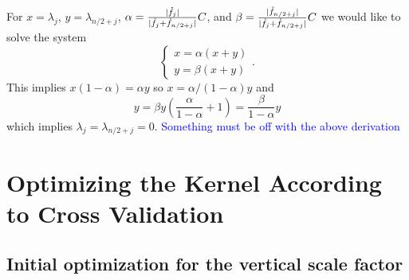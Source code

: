 \documentclass{amsart}
\begin{document}
For $x=\lambda_j$, $y=\lambda_{n/2+j}$, $\alpha = \frac{\lvert \mathring{f}_j \rvert}{\lvert \mathring{f}_j + \mathring{f}_{n/2+j} \rvert}C$, and $\beta = \frac{\lvert \mathring{f}_{n/2+j} \rvert}{\lvert \mathring{f}_j + \mathring{f}_{n/2+j} \rvert}C$ we would like to solve the system 
$$\begin{cases} x = \alpha (x+y) \\ y = \beta (x+y) \end{cases}.$$ 
This implies $x(1-\alpha) = \alpha y$ so $x = \alpha/(1-\alpha) y$ and 
$$y = \beta y \left(\frac{\alpha}{1-\alpha} + 1\right) = \frac{\beta}{1-\alpha} y$$
which implies $\lambda_j=\lambda_{n/2+j}=0$. \textcolor{blue}{Something must be off with the above derivation}

\fi






\section{Optimizing the Kernel According to Cross Validation}
\subsection{Initial optimization for the vertical scale factor}
\end{document}
